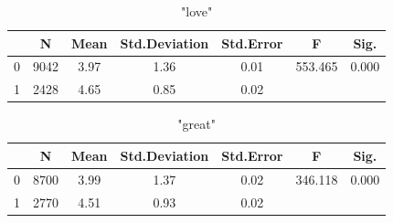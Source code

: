 \documentclass{mcmthesis}
\begin{document}
\begin{table}[H]
	\center
	\caption{"love"}
	\label{type}
	\begin{tabular}{c|c|c|c|c|c|c}
		\hline
		\textbf{} & \textbf{N} & \textbf{Mean}& \textbf{Std.Deviation}& \textbf{Std.Error}& \textbf{F}& \textbf{Sig.} \\ \hline 
		0        & 9042             & 3.97           & 1.36         & 0.01    & 553.465 & 0.000    \\
		1          & 2428          & 4.65           & 0.85         & 0.02    &  & \\ \hline

	\end{tabular}
\end{table}
\begin{table}[H]
	\center
	\caption{"great"}
	\label{type}
	\begin{tabular}{c|c|c|c|c|c|c}
		\hline
		\textbf{} & \textbf{N} & \textbf{Mean}& \textbf{Std.Deviation}& \textbf{Std.Error}& \textbf{F}& \textbf{Sig.} \\ \hline 
		0        & 8700             & 3.99           & 1.37         & 0.02    & 346.118 & 0.000    \\
		1          & 2770          & 4.51           & 0.93         & 0.02    &  & \\ \hline
	\end{tabular}
\end{table}
\end{document}

